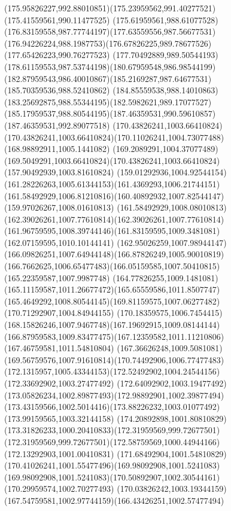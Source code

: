 {{	\curveto(175.95826227,992.88010851)(175.23959562,991.40277521)(175.41559561,990.11477525)
	\curveto(175.61959561,988.61077528)(176.83159558,987.77744197)(177.63559556,987.56677531)
	\curveto(176.94226224,988.1987753)(176.67826225,989.78677526)(177.65426223,990.76277523)
	\curveto(177.70492889,989.50544193)(178.61159553,987.53744198)(180.67959548,986.98544199)
	\curveto(182.87959543,986.40010867)(185.2169287,987.64677531)(185.70359536,988.52410862)
	\curveto(184.85559538,988.14010863)(183.25692875,988.55344195)(182.5982621,989.17077527)
	\curveto(185.17959537,988.80544195)(187.46359531,990.59610857)(187.46359531,992.89077518)
	\moveto(170.43826241,1003.66410824)
	\curveto(170.43826241,1003.66410824)(170.11026241,1004.73077488)(168.98892911,1005.1441082)
	\curveto(169.2089291,1004.37077489)(169.5049291,1003.66410824)(170.43826241,1003.66410824)
	\moveto(157.90492939,1003.81610824)
	\curveto(159.01292936,1004.92544154)(161.28226263,1005.61344153)(161.4369293,1006.21744151)
	\curveto(161.58492929,1006.81210816)(160.40892932,1007.82544147)(159.97026267,1008.01610813)
	\curveto(161.58492929,1008.08010813)(162.39026261,1007.77610814)(162.39026261,1007.77610814)
	\curveto(161.96759595,1008.39744146)(161.83159595,1009.3481081)(162.07159595,1010.10144141)
	\curveto(162.95026259,1007.98944147)(166.09826251,1007.64944148)(166.87826249,1005.90010819)
	\curveto(166.7662625,1006.65477483)(166.05159585,1007.50410815)(165.22359587,1007.9987748)
	\curveto(164.77826255,1009.1481081)(165.11159587,1011.26677472)(165.65559586,1011.8507747)
	\curveto(165.4649292,1008.80544145)(169.81159575,1007.06277482)(170.71292907,1004.84944155)
	\curveto(170.18359575,1006.7454415)(168.15826246,1007.9467748)(167.19692915,1009.08144144)
	\curveto(166.87959583,1009.83477475)(167.12359582,1011.11210806)(167.46759581,1011.54810804)
	\curveto(167.36626248,1009.5081081)(169.56759576,1007.91610814)(170.74492906,1006.77477483)
	\curveto(172.1315957,1005.43344153)(172.52492902,1004.24544156)(172.33692902,1003.27477492)
	\curveto(172.64092902,1003.19477492)(173.05826234,1002.89877493)(172.98892901,1002.39877494)
	\curveto(173.43159566,1002.5014416)(173.88226232,1003.01077492)(173.99159565,1003.32144158)
	\curveto(174.20892898,1001.80810829)(173.31826233,1000.20410833)(172.31959569,999.72677501)
	\curveto(172.31959569,999.72677501)(172.58759569,1000.44944166)(172.13292903,1001.00410831)
	\curveto(171.68492904,1001.54810829)(170.41026241,1001.55477496)(169.98092908,1001.5241083)
	\curveto(169.98092908,1001.5241083)(170.50892907,1002.30544161)(170.29959574,1002.70277493)
	\curveto(170.03826242,1003.19344159)(167.54759581,1002.97744159)(166.43426251,1002.57477494)
}}
